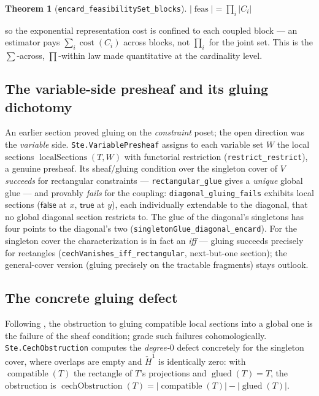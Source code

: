 \documentclass[11pt]{article}
\newtheorem{theorem}{Theorem}
\newcommand{\lean}[1]{\texttt{#1}}
\begin{document}
\begin{theorem}[\lean{encard\_feasibilitySet\_blocks}]
$\bigl|\operatorname{feas}\bigr| = \prod_{i} |C_i|$
\end{theorem}

\noindent so the exponential representation cost is confined to each
coupled block --- an estimator pays $\sum_i \operatorname{cost}(C_i)$
across blocks, not $\prod_i$ for the joint set.  This is the
$\sum$-across, $\prod$-within law made quantitative at the cardinality
level.

\subsection{The variable-side presheaf and its gluing dichotomy}
An earlier section proved gluing on the \emph{constraint} poset; the
open direction was the \emph{variable} side.  \lean{Ste.VariablePresheaf}
assigns to each variable set $W$ the local sections
$\operatorname{localSections}(T, W)$ with functorial restriction
(\lean{restrict\_restrict}), a genuine presheaf.  Its sheaf/gluing
condition over the singleton cover of $V$ \emph{succeeds} for
rectangular constraints --- \lean{rectangular\_glue} gives a
\emph{unique} global glue --- and provably \emph{fails} for the
coupling: \lean{diagonal\_gluing\_fails} exhibits local sections
($\mathsf{false}$ at $x$, $\mathsf{true}$ at $y$), each individually
extendable to the diagonal, that no global diagonal section restricts
to.  The glue of the diagonal's singletons has four points to the
diagonal's two (\lean{singletonGlue\_diagonal\_encard}).  For the
singleton cover the characterization is in fact an \emph{iff} ---
gluing succeeds precisely for rectangles
(\lean{cechVanishes\_iff\_rectangular}, next-but-one section); the
general-cover version (gluing precisely on the tractable fragments)
stays outlook.

\subsection{The concrete gluing defect}
Following \citet{abramsky2011sheaf}, the obstruction to gluing
compatible local sections into a global one is the failure of the sheaf
condition; \citet{abramsky2012cohomology} grade such failures
cohomologically.  \lean{Ste.CechObstruction} computes the
\emph{degree-$0$} defect concretely for the singleton cover, where
overlaps are empty and $\check{H}^1$ is identically zero: with $\operatorname{compatible}(T)$ the rectangle of $T$'s
projections and $\operatorname{glued}(T) = T$, the obstruction is
$\operatorname{cechObstruction}(T) = |\operatorname{compatible}(T)| -
|\operatorname{glued}(T)|$.
\end{document}
